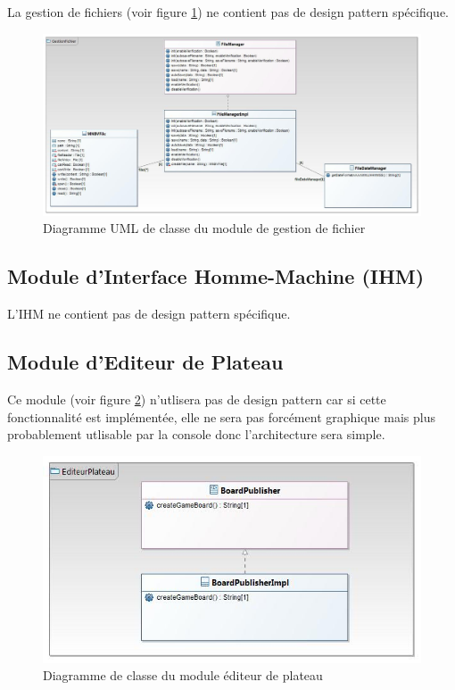 \documentclass[a4paper,12pt]{article}
\begin{document}
La gestion de fichiers (voir figure \ref{gest}) ne contient pas de design pattern spécifique.

\begin{figure}[H]
\includegraphics[scale=0.42]{GestionFichiers.jpg}
\caption{Diagramme UML de classe du module de gestion de fichier}
\label{gest}
\end{figure}

\subsection{Module d'Interface Homme-Machine (IHM)}

L’IHM ne contient pas de design pattern spécifique.


\subsection{Module d'Editeur de Plateau}

Ce module (voir figure \ref{edit}) n'utlisera pas de design pattern car si cette fonctionnalité est implémentée, elle ne sera pas forcément graphique mais plus probablement utlisable par la console donc l'architecture sera simple. 


\begin{figure}[H]
\includegraphics[scale=0.75]{EditeurPlateau.jpg}
\caption{Diagramme de classe du module éditeur de plateau}
\label{edit}
\end{figure}
\end{document}
